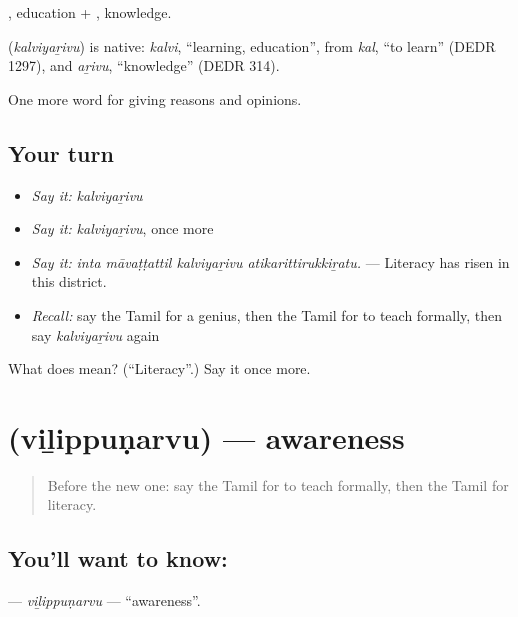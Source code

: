, education + , knowledge.

\begin{cousinweb}
\textbf{} (\emph{kalviyaṟivu}) is native: \emph{kalvi}, \textquotedblleft{}learning, education\textquotedblright{}, from \emph{kal}, \textquotedblleft{}to learn\textquotedblright{} (DEDR 1297), and \emph{aṟivu}, \textquotedblleft{}knowledge\textquotedblright{} (DEDR 314).
\end{cousinweb}

\begin{grammarlens}[title={What you've built}]
One more word for giving reasons and opinions.
\end{grammarlens}

\subsection*{Your turn}
\begin{itemize}
\raggedright
  \item \emph{Say it:} \emph{kalviyaṟivu}
  \item \emph{Say it:} \emph{kalviyaṟivu}, once more
  \item \emph{Say it:} \emph{inta māvaṭṭattil kalviyaṟivu atikarittirukkiṟatu.} — Literacy has risen in this district.
  \item \emph{Recall:} say the Tamil for a genius, then the Tamil for to teach formally, then say \emph{kalviyaṟivu} again
\end{itemize}

\begin{tcolorbox}[breakable,colback=teal!4,colframe=teal!35!black,title={Before you move on}]
What does  mean? (\textquotedblleft{}Literacy\textquotedblright{}.) Say it once more.
\end{tcolorbox}
\section[\texorpdfstring{\ta{விழிப்புணர்வு} (viḻippuṇarvu)}{விழிப்புணர்வு (viḻippuṇarvu)}]{ (viḻippuṇarvu) — awareness}

\label{lesson:TA-C368-vilippunarvu}



\begin{quote}
Before the new one: say the Tamil for to teach formally, then the Tamil for literacy.
\end{quote}

\subsection*{You'll want to know: }
\textbf{} — \emph{viḻippuṇarvu} — \textquotedblleft{}awareness\textquotedblright{}.

